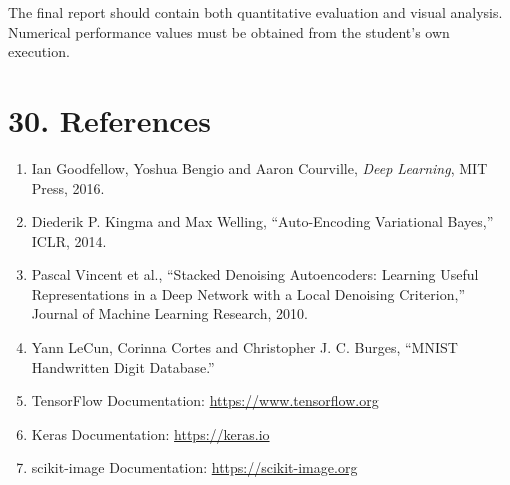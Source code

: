 \documentclass[10pt]{article}
\begin{document}
The final report should contain both quantitative evaluation and visual
analysis. Numerical performance values must be obtained from the student's
own execution.

\section*{30. References}

\begin{enumerate}
\item Ian Goodfellow, Yoshua Bengio and Aaron Courville,
\emph{Deep Learning}, MIT Press, 2016.

\item Diederik P. Kingma and Max Welling,
``Auto-Encoding Variational Bayes,'' ICLR, 2014.

\item Pascal Vincent et al.,
``Stacked Denoising Autoencoders: Learning Useful Representations in a Deep
Network with a Local Denoising Criterion,'' Journal of Machine Learning
Research, 2010.

\item Yann LeCun, Corinna Cortes and Christopher J. C. Burges,
``MNIST Handwritten Digit Database.''

\item TensorFlow Documentation:
\url{https://www.tensorflow.org}

\item Keras Documentation:
\url{https://keras.io}

\item scikit-image Documentation:
\url{https://scikit-image.org}
\end{enumerate}
\end{document}
